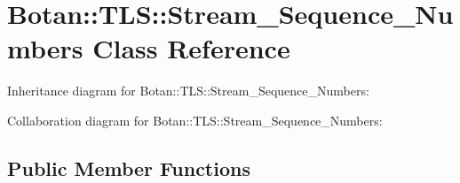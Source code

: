 \hypertarget{class_botan_1_1_t_l_s_1_1_stream___sequence___numbers}{}\section{Botan\+:\+:T\+LS\+:\+:Stream\+\_\+\+Sequence\+\_\+\+Numbers Class Reference}
\label{class_botan_1_1_t_l_s_1_1_stream___sequence___numbers}


Inheritance diagram for Botan\+:\+:T\+LS\+:\+:Stream\+\_\+\+Sequence\+\_\+\+Numbers\+:


Collaboration diagram for Botan\+:\+:T\+LS\+:\+:Stream\+\_\+\+Sequence\+\_\+\+Numbers\+:
\subsection*{Public Member Functions}
